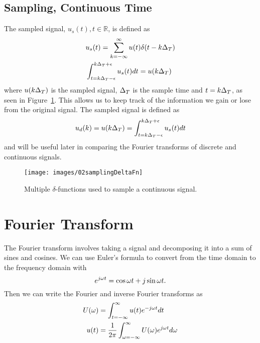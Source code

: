 \subsection{Sampling, Continuous Time}
The sampled signal, $u_s(t), t \in \mathbb{R}$, is defined as
\begin{align*}
&u_s(t) = \sum_{k=-\infty}^\infty u(t)\delta(t-k\Delta_T) \\
&\int_{t=k\Delta_T-\epsilon}^{k\Delta_T+\epsilon} u_s(t)dt = u(k\Delta_T)
\end{align*}
where $u(k\Delta_T)$ is the sampled signal, $\Delta_T$ is the sample time and $t=k\Delta_T$, as seen in Figure~\ref{fig:02samplingDeltaFn}.
This allows us to keep track of the information we gain or lose from the original signal.
The sampled signal is defined as
$$u_d(k) = u(k\Delta_T) = \int_{t=k\Delta_T-\epsilon}^{k\Delta_T+\epsilon} u_s(t)dt$$
and will be useful later in comparing the Fourier transforms of discrete and continuous signals.
\begin{figure}[ht!]
\centering
\texttt{[image: images/02samplingDeltaFn]}
\caption{Multiple $\delta$-functions used to sample a continuous signal.}
\label{fig:02samplingDeltaFn}
\end{figure}

\section{Fourier Transform}
The Fourier transform involves taking a signal and decomposing it into a sum of sines and cosines.
We can use Euler's formula to convert from the time domain to the frequency domain with
$$e^{j\omega t} = \cos\omega t + j\sin\omega t.$$
Then we can write the Fourier and inverse Fourier transforms as
\begin{align*}
U(\omega) &= \int_{t=-\infty}^\infty u(t)e^{-j\omega t}dt \\
u(t) &= \frac{1}{2\pi} \int_{\omega=-\infty}^\infty U(\omega)e^{j\omega t}d\omega
\end{align*}

